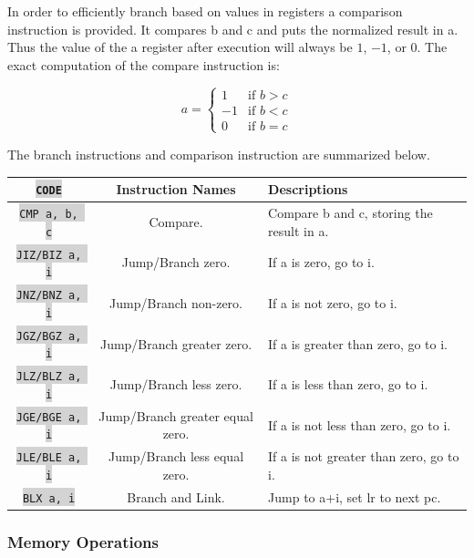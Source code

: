\documentclass{article}
\newcommand{\vnscode}[1]{\colorbox{lightgray}{\lstinline[language=vns]{#1}}}
\begin{document}
In order to efficiently branch based on values in registers a comparison
instruction is provided. It compares b and c and puts the normalized result in
a. Thus the value of the a register after execution will always be $1$, $-1$, or
$0$. The exact computation of the compare instruction is:

\begin{displaymath}
    a = \begin{cases}
        1 & \mbox{if } b > c \\
        -1 & \mbox{if } b < c \\
        0 & \mbox{if } b = c \end{cases}
\end{displaymath}

The branch instructions and comparison instruction are summarized below.

\begin{minipage}{\textwidth}
\label{table:branch}
\centering
\begin{tabular}{|c|c|l|}
    \hline \vnscode{CODE} & Instruction Names & Descriptions \\ \hline
    \vnscode{CMP a, b, c} & Compare. & Compare b and c, storing the result in a. \\ \hline
    \vnscode{JIZ/BIZ a, i} & Jump/Branch zero. & If a is zero, go to i. \\ \hline
    \vnscode{JNZ/BNZ a, i} & Jump/Branch non-zero. & If a is not zero, go to i. \\ \hline
    \vnscode{JGZ/BGZ a, i} & Jump/Branch greater zero. & If a is greater than zero, go to i. \\ \hline
    \vnscode{JLZ/BLZ a, i} & Jump/Branch less zero. & If a is less than zero, go to i. \\ \hline
    \vnscode{JGE/BGE a, i} & Jump/Branch greater equal zero. & If a is not less than zero, go to i. \\ \hline
    \vnscode{JLE/BLE a, i} & Jump/Branch less equal zero. & If a is not greater than zero, go to i. \\ \hline
    \vnscode{BLX a, i} & Branch and Link. & Jump to a+i, set lr to next pc. \\ \hline
\end{tabular}
\end{minipage}

\subsubsection{Memory Operations}
\end{document}
